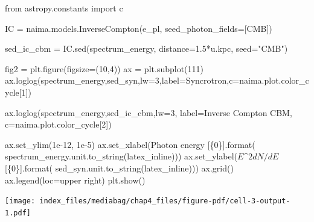 \documentclass[
  letterpaper,
  DIV=11,
  numbers=noendperiod]{scrreprt}
\newenvironment{Shaded}{\begin{snugshade}}{\end{snugshade}}
\newcommand{\BuiltInTok}[1]{\textcolor[rgb]{0.00,0.23,0.31}{#1}}
\newcommand{\DecValTok}[1]{\textcolor[rgb]{0.68,0.00,0.00}{#1}}
\newcommand{\FloatTok}[1]{\textcolor[rgb]{0.68,0.00,0.00}{#1}}
\newcommand{\ImportTok}[1]{\textcolor[rgb]{0.00,0.46,0.62}{#1}}
\newcommand{\NormalTok}[1]{\textcolor[rgb]{0.00,0.23,0.31}{#1}}
\newcommand{\OperatorTok}[1]{\textcolor[rgb]{0.37,0.37,0.37}{#1}}
\newcommand{\SpecialCharTok}[1]{\textcolor[rgb]{0.37,0.37,0.37}{#1}}
\newcommand{\StringTok}[1]{\textcolor[rgb]{0.13,0.47,0.30}{#1}}
\begin{document}
\begin{Shaded}
\begin{Highlighting}[]
\ImportTok{from}\NormalTok{ astropy.constants }\ImportTok{import}\NormalTok{ c}

\NormalTok{IC }\OperatorTok{=}\NormalTok{ naima.models.InverseCompton(e\_pl, seed\_photon\_fields}\OperatorTok{=}\NormalTok{[}\StringTok{\textquotesingle{}CMB\textquotesingle{}}\NormalTok{])}

\NormalTok{sed\_ic\_cbm }\OperatorTok{=}\NormalTok{ IC.sed(spectrum\_energy, distance}\OperatorTok{=}\FloatTok{1.5}\OperatorTok{*}\NormalTok{u.kpc, seed}\OperatorTok{=}\StringTok{"CMB"}\NormalTok{)}

\NormalTok{fig2 }\OperatorTok{=}\NormalTok{ plt.figure(figsize}\OperatorTok{=}\NormalTok{(}\DecValTok{10}\NormalTok{,}\DecValTok{4}\NormalTok{))}
\NormalTok{ax }\OperatorTok{=}\NormalTok{ plt.subplot(}\DecValTok{111}\NormalTok{)}
\NormalTok{ax.loglog(spectrum\_energy,sed\_syn,lw}\OperatorTok{=}\DecValTok{3}\NormalTok{,label}\OperatorTok{=}\StringTok{\textquotesingle{}Syncrotron\textquotesingle{}}\NormalTok{,c}\OperatorTok{=}\NormalTok{naima.plot.color\_cycle[}\DecValTok{1}\NormalTok{])}

\NormalTok{ax.loglog(spectrum\_energy,sed\_ic\_cbm,lw}\OperatorTok{=}\DecValTok{3}\NormalTok{,}
\NormalTok{        label}\OperatorTok{=}\StringTok{\textquotesingle{}Inverse Compton CBM\textquotesingle{}}\NormalTok{, c}\OperatorTok{=}\NormalTok{naima.plot.color\_cycle[}\DecValTok{2}\NormalTok{])}

\NormalTok{ax.set\_ylim(}\FloatTok{1e{-}12}\NormalTok{, }\FloatTok{1e{-}5}\NormalTok{)}
\NormalTok{ax.set\_xlabel(}\StringTok{\textquotesingle{}Photon energy [}\SpecialCharTok{\{0\}}\StringTok{]\textquotesingle{}}\NormalTok{.}\BuiltInTok{format}\NormalTok{(}
\NormalTok{        spectrum\_energy.unit.to\_string(}\StringTok{\textquotesingle{}latex\_inline\textquotesingle{}}\NormalTok{)))}
\NormalTok{ax.set\_ylabel(}\StringTok{\textquotesingle{}$E\^{}2 dN/dE$ [}\SpecialCharTok{\{0\}}\StringTok{]\textquotesingle{}}\NormalTok{.}\BuiltInTok{format}\NormalTok{(}
\NormalTok{        sed\_syn.unit.to\_string(}\StringTok{\textquotesingle{}latex\_inline\textquotesingle{}}\NormalTok{)))}
\NormalTok{ax.grid()}
\NormalTok{ax.legend(loc}\OperatorTok{=}\StringTok{\textquotesingle{}upper right\textquotesingle{}}\NormalTok{)}
\NormalTok{plt.show()}
\end{Highlighting}
\end{Shaded}

\texttt{[image: index\_files/mediabag/chap4\_files/figure-pdf/cell-3-output-1.pdf]}
\end{document}

